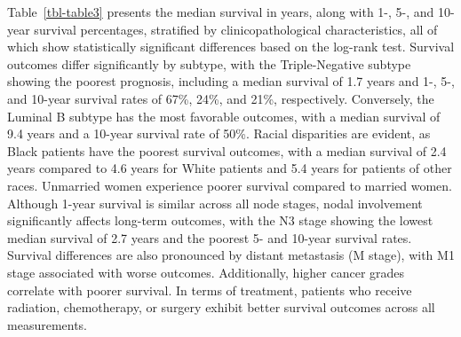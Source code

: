\documentclass[
  letterpaper,
  DIV=11,
  numbers=noendperiod]{scrartcl}
\begin{document}
Table~\ref{tbl-table3} presents the median survival in years, along with
1-, 5-, and 10-year survival percentages, stratified by
clinicopathological characteristics, all of which show statistically
significant differences based on the log-rank test. Survival outcomes
differ significantly by subtype, with the Triple-Negative subtype
showing the poorest prognosis, including a median survival of 1.7 years
and 1-, 5-, and 10-year survival rates of 67\%, 24\%, and 21\%,
respectively. Conversely, the Luminal B subtype has the most favorable
outcomes, with a median survival of 9.4 years and a 10-year survival
rate of 50\%. Racial disparities are evident, as Black patients have the
poorest survival outcomes, with a median survival of 2.4 years compared
to 4.6 years for White patients and 5.4 years for patients of other
races. Unmarried women experience poorer survival compared to married
women. Although 1-year survival is similar across all node stages, nodal
involvement significantly affects long-term outcomes, with the N3 stage
showing the lowest median survival of 2.7 years and the poorest 5- and
10-year survival rates. Survival differences are also pronounced by
distant metastasis (M stage), with M1 stage associated with worse
outcomes. Additionally, higher cancer grades correlate with poorer
survival. In terms of treatment, patients who receive radiation,
chemotherapy, or surgery exhibit better survival outcomes across all
measurements.
\end{document}
